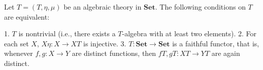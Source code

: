 Let $T = (T, \eta, \mu)$ be an algebraic theory in $\mathbf{Set}$. The following conditions on $T$ are equivalent:

1. $T$ is nontrivial (i.e., there exists a $T$-algebra with at least two elements).
2. For each set $X$, $X\eta: X \longrightarrow XT$ is injective.
3. $T: \mathbf{Set} \longrightarrow \mathbf{Set}$ is a faithful functor, that is, whenever $f, g: X \longrightarrow Y$ are distinct functions, then $fT, gT: XT \longrightarrow YT$ are again distinct.
